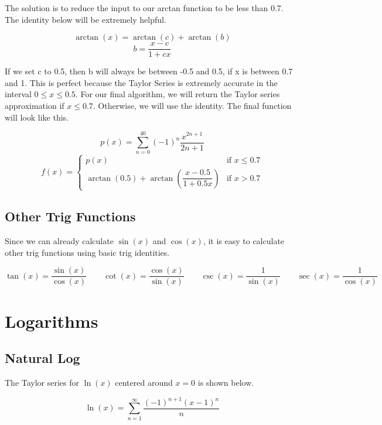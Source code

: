 \documentclass[12pt, letterpaper]{article}
\begin{document}

The solution is to reduce the input to our arctan function to be less than 0.7. The identity below will be extremely helpful.

\[ \arctan(x) = \arctan(c) + \arctan\left(b\right) \]
\[ b = \frac{x-c}{1+cx} \]

If we set c to 0.5, then b will always be between -0.5 and 0.5, if x is between 0.7 and 1. This is perfect because the Taylor Series is extremely accurate in the interval $0 \leq x \leq 0.5$. For our final algorithm, we will return the Taylor series approximation if $x \leq 0.7$. Otherwise, we will use the identity. The final function will look like this.

\[ p(x) = \sum_{n=0}^{40}\left(-1\right)^{n}\frac{x^{2n+1}}{2n+1} \]
\[ f(x) = \begin{cases}
  p(x) & \text{if } x \leq 0.7 \\
  \arctan(0.5) + \arctan\left(\dfrac{x-0.5}{1+0.5x}\right) & \text{if } x > 0.7
\end{cases} \]

\subsection{Other Trig Functions}
Since we can already calculate $\sin(x)$ and $\cos(x)$, it is easy to calculate other trig functions using basic trig identities.

\[ \tan(x) = \frac{\sin(x)}{\cos(x)} \qquad \cot(x) = \frac{\cos(x)}{\sin(x)}  \qquad \csc(x) = \frac{1}{\sin(x)} \qquad \sec(x) = \frac{1}{\cos(x)}
\]

\section{Logarithms}
\subsection{Natural Log}
The Taylor series for $\ln(x)$ centered around $x=0$ is shown below.

\[ \ln(x) = \sum_{n=1}^{\infty}\frac{\left(-1\right)^{n+1}\left(x-1\right)^{n}}{n} \]
\end{document}
